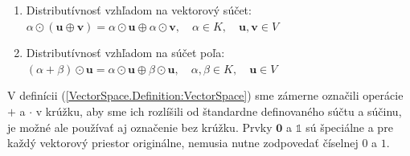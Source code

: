 \documentclass[a4paper, 10pt, ]{article}
\begin{document}
\begin{definition}
\begin{enumerate}
        \item Distributívnosť vzhľadom na vektorový súčet: \\
        \tab\tab $\alpha \odot (\bm{u} \oplus \bm{v}) = \alpha \odot \bm{u} \oplus \alpha \odot \bm{v}, \quad \alpha \in K, \quad \bm{u}, \bm{v} \in V$
        
        \item Distributívnosť vzhľadom na súčet poľa: \\
        \tab\tab $(\alpha + \beta) \odot \bm{u} = \alpha \odot \bm{u} \oplus \beta \odot \bm{u}, \quad \alpha, \beta \in K, \quad \bm{u} \in V$
    \end{enumerate}
\end{definition}

V definícii (\ref{VectorSpace.Definition:VectorSpace}) sme zámerne označili operácie $+$ a $\cdot$ v krúžku, aby sme ich rozlíšili od štandardne definovaného súčtu a súčinu, je možné ale používať aj označenie bez krúžku. Prvky $\bm{0}$ a $\mathbb{1}$ sú špeciálne a pre každý vektorový priestor originálne, nemusia nutne zodpovedať číselnej $0$ a $1$.
\end{document}
